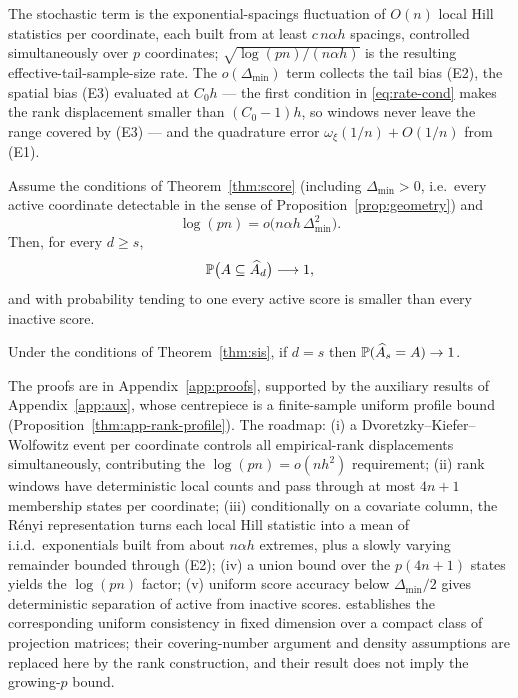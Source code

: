 The stochastic term is the exponential-spacings fluctuation of
$O(n)$ local Hill statistics per coordinate, each built from at least
$c\,n\alpha h$ spacings, controlled simultaneously over $p$ coordinates;
$\sqrt{\log(pn)/(n\alpha h)}$ is the resulting effective-tail-sample-size
rate. The $o(\Delta_{\min})$ term collects the tail bias (E2), the spatial
bias (E3) evaluated at $C_0h$ --- the first condition in
\eqref{eq:rate-cond} makes the rank displacement smaller than $(C_0-1)h$,
so windows never leave the range covered by (E3) --- and the quadrature
error $\omega_\xi(1/n)+O(1/n)$ from (E1).

\begin{theorem}\label{thm:sis}
Assume the conditions of Theorem~\ref{thm:score} (including
$\Delta_{\min}>0$, i.e.\ every active coordinate detectable in the
sense of Proposition~\ref{prop:geometry}) and
\begin{equation}\label{eq:sis-cond}
 \log(pn)=o\bigl(n\alpha h\,\Delta_{\min}^2\bigr).
\end{equation}
Then, for every $d\ge s$,
\[
 \mathbb P\bigl(A\subseteq\widehat{A}_d\bigr)\longrightarrow1,
\]
and with probability tending to one every active score is smaller than
every inactive score.
\end{theorem}

\begin{corollary}\label{cor:exact}
Under the conditions of Theorem~\ref{thm:sis}, if $d=s$ then
$\mathbb P(\widehat{A}_s=A)\to1$.
\end{corollary}

The proofs are in Appendix~\ref{app:proofs}, supported by the auxiliary
results of Appendix~\ref{app:aux}, whose centrepiece is a finite-sample
uniform profile bound (Proposition~\ref{thm:app-rank-profile}). The
roadmap: (i) a Dvoretzky--Kiefer--Wolfowitz event per coordinate controls
all empirical-rank displacements simultaneously, contributing the
$\log(pn)=o(nh^2)$ requirement; (ii) rank windows have deterministic
local counts and pass through at most $4n+1$ membership states per
coordinate; (iii) conditionally on a covariate column, the R\'enyi
representation turns each local Hill statistic into a mean of
i.i.d.\ exponentials built from about $n\alpha h$ extremes, plus a
slowly varying remainder bounded through (E2); (iv) a union bound over
the $p(4n+1)$ states yields the $\log(pn)$ factor; (v) uniform score
accuracy below $\Delta_{\min}/2$ gives deterministic separation of
active from inactive scores. \citet[Theorem~3]{gardesPodgorny2025}
establishes the corresponding uniform consistency in fixed dimension
over a compact class of projection matrices; their covering-number
argument and density assumptions are replaced here by the rank
construction, and their result does not imply the growing-$p$ bound.

